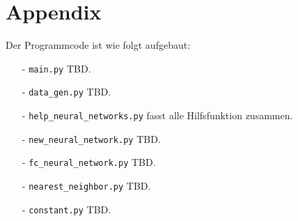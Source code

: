 \chapter*{Appendix}
\label{chap:app}

Der Programmcode ist wie folgt aufgebaut:
\begin{itemize}
    \item[-] \texttt{main.py} TBD.
    \item[-] \texttt{data\_gen.py} TBD.
    \item[-] \texttt{help\_neural\_networks.py} fasst alle Hilfsfunktion zusammen.
    \item[-] \texttt{new\_neural\_network.py} TBD.
    \item[-] \texttt{fc\_neural\_network.py} TBD.
    \item[-] \texttt{nearest\_neighbor.py} TBD.
    \item[-] \texttt{constant.py} TBD.
\end{itemize}
\renewcommand\lstlistingname{Listing}






